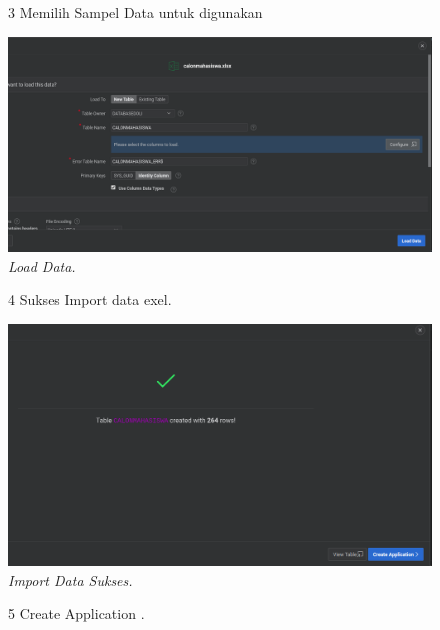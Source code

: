 \begin{enumerate}
\begin{figure}

\item[3] Memilih Sampel Data untuk digunakan

    \begin{center}
\includegraphics[scale=0.3]{figures/dataexel.png}
    \caption{\textit{Load Data.}}
        \end{center}
\label{gambar}
\end{figure}


\begin{figure}
\item[4] Sukses Import data exel.

    \begin{center}
\includegraphics[scale=0.2]{figures/sukses.png}
    \caption{\textit{Import Data Sukses.}}
        \end{center}
\label{gambar}
\end{figure}


\begin{figure}
\item[5]Create Application .


\end{figure}
\end{enumerate}

